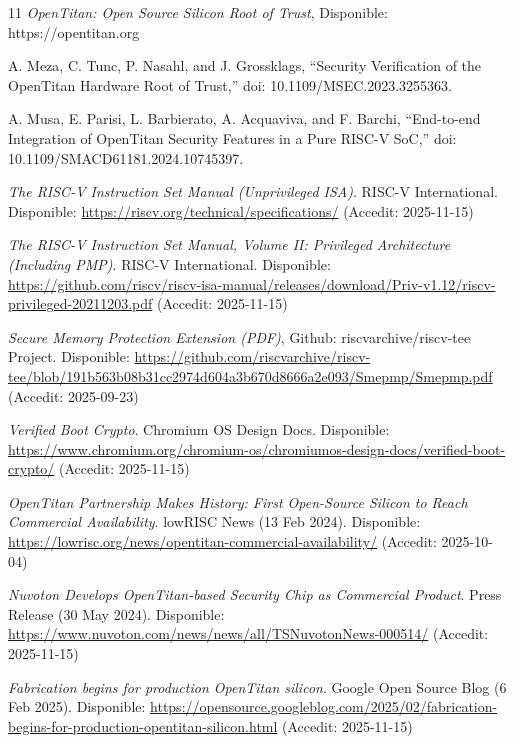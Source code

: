 \documentclass[10pt,a4paper,twocolumn,twoside]{article}
\begin{document}
\begin{thebibliography}{11}
\emph{OpenTitan: Open Source Silicon Root of Trust}, Disponible: https://opentitan.org

A. Meza, C. Tunc, P. Nasahl, and J. Grossklags, 
“Security Verification of the OpenTitan Hardware Root of Trust,” 
doi: 10.1109/MSEC.2023.3255363.

A. Musa, E. Parisi, L. Barbierato, A. Acquaviva, and F. Barchi, 
“End-to-end Integration of OpenTitan Security Features in a Pure RISC-V SoC,” 
doi: 10.1109/SMACD61181.2024.10745397.


\emph{The RISC-V Instruction Set Manual (Unprivileged ISA)}. 
RISC-V International. Disponible: \url{https://riscv.org/technical/specifications/} (Accedit: 2025-11-15)

\emph{The RISC-V Instruction Set Manual, Volume II: Privileged Architecture (Including PMP)}. 
RISC-V International. Disponible: \url{https://github.com/riscv/riscv-isa-manual/releases/download/Priv-v1.12/riscv-privileged-20211203.pdf} (Accedit: 2025-11-15)  

\emph{Secure Memory Protection Extension (PDF)}, 
Github: riscvarchive/riscv-tee Project. Disponible: \url{https://github.com/riscvarchive/riscv-tee/blob/191b563b08b31cc2974d604a3b670d8666a2e093/Smepmp/Smepmp.pdf} (Accedit: 2025-09-23)

\emph{Verified Boot Crypto}. 
Chromium OS Design Docs. Disponible: \url{https://www.chromium.org/chromium-os/chromiumos-design-docs/verified-boot-crypto/} (Accedit: 2025-11-15)

\emph{OpenTitan Partnership Makes History: First Open-Source Silicon to Reach Commercial Availability}. 
lowRISC News (13 Feb 2024). Disponible: \url{https://lowrisc.org/news/opentitan-commercial-availability/} (Accedit: 2025-10-04)


\emph{Nuvoton Develops OpenTitan\textregistered{}-based Security Chip as Commercial Product}. 
Press Release (30 May 2024). Disponible: \url{https://www.nuvoton.com/news/news/all/TSNuvotonNews-000514/} (Accedit: 2025-11-15)

\emph{Fabrication begins for production OpenTitan silicon}. 
Google Open Source Blog (6 Feb 2025). Disponible: \url{https://opensource.googleblog.com/2025/02/fabrication-begins-for-production-opentitan-silicon.html} (Accedit: 2025-11-15)


\end{thebibliography}
\end{document}
